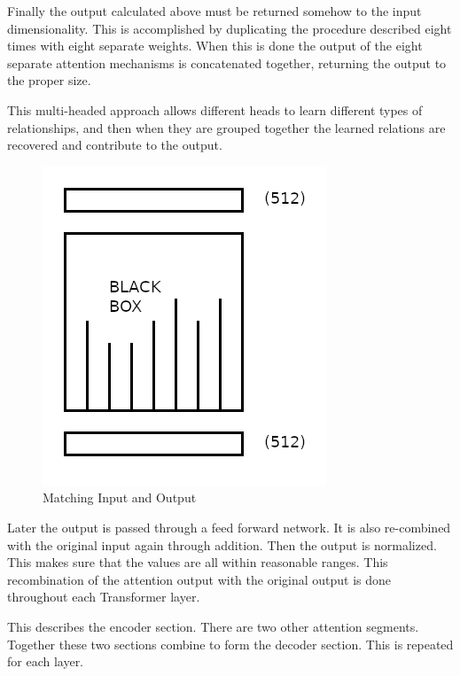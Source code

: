 Finally the output calculated above must be returned somehow to the input dimensionality. This is accomplished by duplicating the procedure described eight times with eight separate weights. When this is done the output of the eight separate attention mechanisms is concatenated together, returning the output to the proper size.

This multi-headed approach allows different heads to learn different types of relationships, and then when they are grouped together the learned relations are recovered and contribute to the output.

\begin{figure}[H]
	\begin{center}
		
	
	\includegraphics[scale=0.5]{diagram-mat02}
\end{center}
	\caption[Matching Input and Output]{Matching Input and Output}
	\label{attention-matching}

\end{figure}


Later the output is passed through a feed forward network. It is also re-combined with the original input again through addition. Then the output is normalized. This makes sure that the values are all within reasonable ranges. This recombination of the attention output with the original output is done throughout each Transformer layer.

This describes the encoder section. There are two other attention segments. Together these two sections combine to form the decoder section. This is repeated for each layer.

